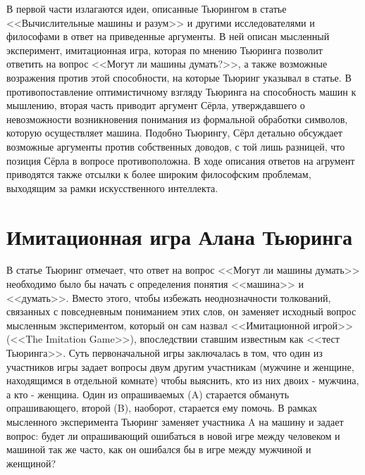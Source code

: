 \documentclass[12pt, specialist, subf, substylefile = spbu.rtx]{disser}
\begin{document}
В первой части излагаются идеи, описанные Тьюрингом в статье <<Вычислительные машины и разум>> и другими исследователями и философами в ответ на приведенные аргументы. В ней описан мысленный эксперимент, имитационная игра, которая по мнению Тьюринга позволит ответить на вопрос <<Могут ли машины думать?>>, а также возможные возражения против этой способности, на которые Тьюринг указывал в статье. В противопоставление оптимистичному взгляду Тьюринга на способность машин к мышлению, вторая часть приводит аргумент Сёрла, утверждавшего о невозможности возникновения понимания из формальной обработки символов, которую осуществляет машина. Подобно Тьюрингу, Сёрл детально обсуждает возможные аргументы против собственных доводов, с той лишь разницей, что позиция Сёрла в вопросе противоположна. В ходе описания ответов на агрумент приводятся также отсылки к более широким философским проблемам, выходящим за рамки искусственного интеллекта.


\chapter{Имитационная игра Алана Тьюринга}
\label{sec:turing}

В статье \cite{turing1950computing} Тьюринг отмечает, что ответ на вопрос <<Могут ли машины думать>> необходимо было бы начать с определения понятия <<машина>> и <<думать>>. Вместо этого, чтобы избежать неоднозначности толкований, связанных с повседневным пониманием этих слов, он заменяет исходный вопрос мысленным экспериментом, который он сам назвал <<Имитационной игрой>> (<<The Imitation Game>>), впоследствии ставшим известным как <<тест Тьюринга>>. Суть первоначальной игры заключалась в том, что один из участников игры задает вопросы двум другим участникам (мужчине и женщине, находящимся в отдельной комнате) чтобы выяснить, кто из них двоих - мужчина, а кто - женщина. Один из опрашиваемых (A) старается обмануть опрашивающего, второй (B), наоборот, старается ему помочь. В рамках мысленного эксперимента Тьюринг заменяет участника A на машину и задает вопрос: будет ли опрашивающий ошибаться в новой игре между человеком и машиной так же часто, как он ошибался бы в игре между мужчиной и женщиной?
\end{document}
